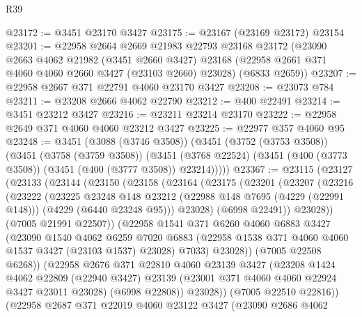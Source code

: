 \begin{lexlean}{R39}
\begin{coremodule}
@23172 := @3451 @23170 @3427
@23175 := @23167 (@23169 @23172) @23154
@23201 := @22958
    @2664
    @2669
    @21983
    @22793
    @23168
    @23172
    (@23090
      @2663
      @4062
      @21982
      (@3451 @2660 @3427)
      @23168
      (@22958 @2661 @371 @4060 @4060 @2660 @3427 (@23103 @2660) @23028)
      (@6833 @2659))
@23207 := @22958 @2667 @371 @22791 @4060 @23170 @3427
@23208 := @23073 @784
@23211 := @23208 @2666 @4062 @22790
@23212 := @400 @22491
@23214 := @3451 @23212 @3427
@23216 := @23211 @23214 @23170
@23222 := @22958 @2649 @371 @4060 @4060 @23212 @3427
@23225 := @22977 @357 @4060 @95
@23248 := @3451
    (@3088 (@3746 @3508))
    (@3451
      (@3752 (@3753 @3508))
      (@3451
        (@3758 (@3759 @3508))
        (@3451 (@3768 @22524) (@3451 (@400 (@3773 @3508)) (@3451 (@400 (@3777 @3508)) @23214)))))
@23367 := @23115
    (@23127
      (@23133
        (@23144
          (@23150
            (@23158
              (@23164
                (@23175
                  (@23201
                    (@23207
                      (@23216
                        (@23222
                          (@23225
                            @23248
                            @148
                            @23212
                            (@22988 @148 @7695 (@4229 (@22991 @148)))
                            (@4229 (@6440 @23248 @95)))
                          @23028)
                        (@6998 @22491))
                      @23028))
                  (@7005 @21991 @22507))
                (@22958
                  @1541
                  @371
                  @6260
                  @4060
                  @6883
                  @3427
                  (@23090
                    @1540
                    @4062
                    @6259
                    @7020
                    @6883
                    (@22958 @1538 @371 @4060 @4060 @1537 @3427 (@23103 @1537) @23028)
                    @7033)
                  @23028))
              (@7005 @22508 @6268))
            (@22958
              @2676
              @371
              @22810
              @4060
              @23139
              @3427
              (@23208
                @1424
                @4062
                @22809
                (@22940 @3427)
                @23139
                (@23001 @371 @4060 @4060 @22924 @3427 @23011 @23028)
                (@6998 @22808))
              @23028))
          (@7005 @22510 @22816))
        (@22958
          @2687
          @371
          @22019
          @4060
          @23122
          @3427
          (@23090
            @2686
            @4062

\end{coremodule}
\end{lexlean}
